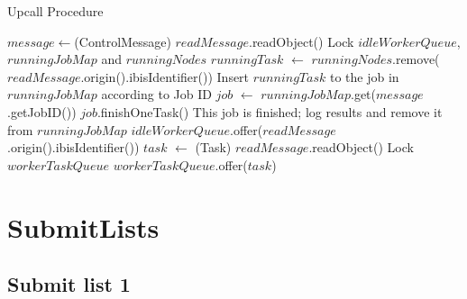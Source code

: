 \begin{algorithm}
    \caption{Upcall Procedure}\label{algo:upcall}
    \begin{algorithmic}[1]
            \State $message\gets$(ControlMessage) $readMessage$.readObject()
            \State Lock $idleWorkerQueue$,$runningJobMap$ and $runningNodes$
            \State $runningTask$ $\gets$ $runningNodes$.remove($readMessage$.origin().ibisIdentifier())
             
                    \State Insert $runningTask$ to the job in $runningJobMap$ according to Job ID 
                \EndIf
            \Else
                \State $job$ $\gets$ $runningJobMap$.get($message$.getJobID())
                \State $job$.finishOneTask()
                    \State This job is finished; log results and remove it from $runningJobMap$
                \EndIf
            \EndIf
            \State $idleWorkerQueue$.offer($readMessage$.origin().ibisIdentifier())
        \Else {}
            \State $task$ $\gets$ (Task) $readMessage$.readObject()
            \State Lock $workerTaskQueue$
            \State $workerTaskQueue$.offer($task$)
        \EndIf
        \EndProcedure
    \end{algorithmic}
\end{algorithm}

\section{SubmitLists}
\subsection{Submit list 1}

